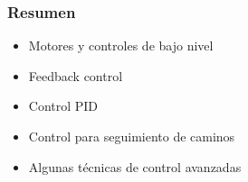 \begin{frame}
    \frametitle{Resumen}
    
    \begin{itemize}
        \item Motores y controles de bajo nivel
        \item Feedback control
        \item Control PID
        \item Control para seguimiento de caminos
        \item Algunas técnicas de control avanzadas
    \end{itemize}
    
\end{frame}